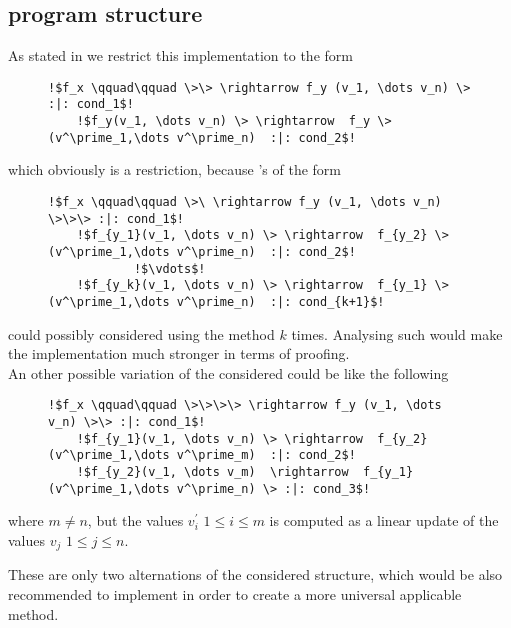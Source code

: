 \subsection{\its program structure}
\label{sec:structure-improvement}
As stated in  we restrict this implementation to the form 
\begin{figure}[H]
	\begin{lstlisting}[escapechar=!]
	!$f_x \qquad\qquad \>\> \rightarrow f_y (v_1, \dots v_n) \> :|: cond_1$!
	!$f_y(v_1, \dots v_n) \> \rightarrow  f_y \>(v^\prime_1,\dots v^\prime_n)  :|: cond_2$!
	\end{lstlisting}
\end{figure}
which obviously is a restriction, because \its's of the form
\begin{figure}[H]
	\begin{lstlisting}[escapechar=!]
	!$f_x \qquad\qquad \>\ \rightarrow f_y (v_1, \dots v_n) \>\>\> :|: cond_1$!
	!$f_{y_1}(v_1, \dots v_n) \> \rightarrow  f_{y_2} \>(v^\prime_1,\dots v^\prime_n)  :|: cond_2$!
			!$\vdots$!
	!$f_{y_k}(v_1, \dots v_n) \> \rightarrow  f_{y_1} \>(v^\prime_1,\dots v^\prime_n)  :|: cond_{k+1}$!
	\end{lstlisting}
\end{figure}
could possibly considered using the method $k$ times. Analysing such \its would make the implementation much stronger in terms of proofing.
\\
An other possible variation of the considered \its could be like the following
\begin{figure}[H]
	\begin{lstlisting}[escapechar=!]
	!$f_x \qquad\qquad \>\>\>\> \rightarrow f_y (v_1, \dots v_n) \>\> :|: cond_1$!
	!$f_{y_1}(v_1, \dots v_n) \> \rightarrow  f_{y_2} (v^\prime_1,\dots v^\prime_m)  :|: cond_2$!
	!$f_{y_2}(v_1, \dots v_m)  \rightarrow  f_{y_1} (v^\prime_1,\dots v^\prime_n) \> :|: cond_3$!
	\end{lstlisting}
\end{figure}
where $m \ne n$, but the values $v^\prime_i$ $1 \le i \le m$ is computed as a linear update of the values $v_j$ $1 \le j \le n$.

These are only two alternations of the considered structure, which would be also recommended to implement in order to create a more universal applicable method.

